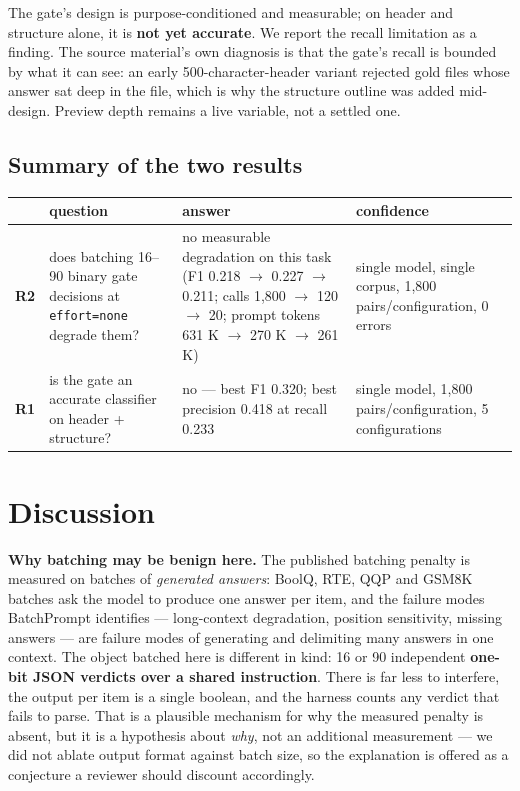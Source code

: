 \documentclass[10pt]{article}
\begin{document}
The gate's design is purpose-conditioned and measurable; on header and structure alone, it is \textbf{not yet accurate}. We report the recall limitation as a finding. The source material's own diagnosis is that the gate's recall is bounded by what it can see: an early 500-character-header variant rejected gold files whose answer sat deep in the file, which is why the structure outline was added mid-design. Preview depth remains a live variable, not a settled one.

\subsection{Summary of the two results}


\begin{center}
\begin{tabular}{@{}>{\raggedright\arraybackslash}p{}>{\raggedright\arraybackslash}p{}>{\raggedright\arraybackslash}p{}>{\raggedright\arraybackslash}p{}@{}}
\hline
\textbf{} & \textbf{question} & \textbf{answer} & \textbf{confidence} \\ \hline
\textbf{R2} & does batching 16--90 binary gate decisions at \texttt{effort=none} degrade them? & no measurable degradation on this task (F1 0.218 $\to$ 0.227 $\to$ 0.211; calls 1,800 $\to$ 120 $\to$ 20; prompt tokens 631 K $\to$ 270 K $\to$ 261 K) & single model, single corpus, 1,800 pairs/configuration, 0 errors \\ \hline
\textbf{R1} & is the gate an accurate classifier on header + structure? & no --- best F1 0.320; best precision 0.418 at recall 0.233 & single model, 1,800 pairs/configuration, 5 configurations \\ \hline
\end{tabular}
\end{center}

\section{Discussion}

\textbf{Why batching may be benign here.} The published batching penalty is measured on batches of \emph{generated answers}: BoolQ, RTE, QQP and GSM8K batches ask the model to produce one answer per item, and the failure modes BatchPrompt identifies --- long-context degradation, position sensitivity, missing answers --- are failure modes of generating and delimiting many answers in one context. The object batched here is different in kind: 16 or 90 independent \textbf{one-bit JSON verdicts over a shared instruction}. There is far less to interfere, the output per item is a single boolean, and the harness counts any verdict that fails to parse. That is a plausible mechanism for why the measured penalty is absent, but it is a hypothesis about \emph{why}, not an additional measurement --- we did not ablate output format against batch size, so the explanation is offered as a conjecture a reviewer should discount accordingly.
\end{document}
